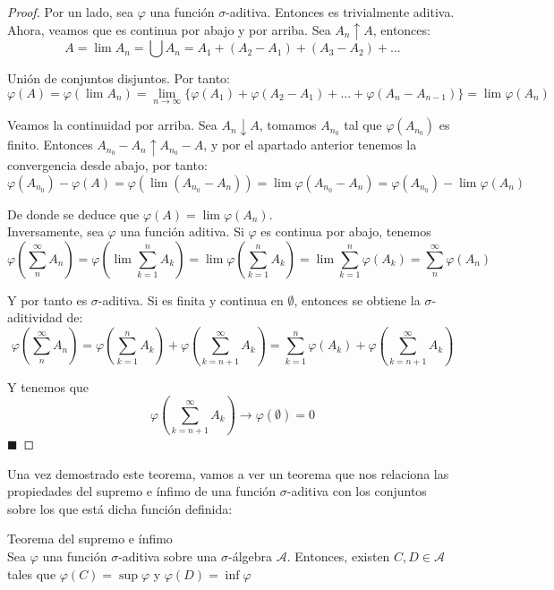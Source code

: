 \documentclass[12pt,a4paper]{book}
\newcommand*{\qed}{\hfill\ensuremath{\blacksquare}}
\begin{document}
\begin{proof}
Por un lado, sea $\varphi$ una función $\sigma$-aditiva. Entonces es trivialmente aditiva. Ahora, veamos que es continua por abajo y por arriba. Sea $A_n \uparrow A$, entonces:
$$ A = \lim A_n = \bigcup A_n = A_1 + (A_2 - A_1) + (A_3 - A_2) +... $$

Unión de conjuntos disjuntos. Por tanto:
$$ \varphi (A) = \varphi (\lim A_n) = \lim_{n \to \infty } \{ \varphi (A_1) + \varphi (A_2 - A_1) + ... + \varphi (A_n - A_{n-1}) \} = \lim \varphi (A_n) $$

Veamos la continuidad por arriba. Sea $A_n \downarrow A$, tomamos $A_{n_0}$ tal que $\varphi (A_{n_0})$ es finito. Entonces $A_{n_0} - A_n \uparrow A_{n_0} - A$, y por el apartado anterior tenemos la convergencia desde abajo, por tanto:
$$ \varphi (A_{n_0}) - \varphi (A) = \varphi (\lim (A_{n_0} - A_n)) = \lim \varphi (A_{n_0} - A_n) = \varphi (A_{n_0}) - \lim \varphi (A_n) $$

De donde se deduce que $ \varphi (A) = \lim \varphi (A_n) $.\\

Inversamente, sea $ \varphi$ una función aditiva. Si $\varphi$ es continua por abajo, tenemos
$$ \varphi \left( \sum_{n}^{\infty} A_n \right) = \varphi \left( \lim \sum_{k=1}^n A_k \right) = \lim \varphi \left( \sum_{k=1}^n A_k \right) = \lim \sum_{k=1}^n \varphi \left( A_k \right) = \sum_{n}^{\infty} \varphi (A_n) $$

Y por tanto es $\sigma$-aditiva. Si es finita y continua en $\emptyset$, entonces se obtiene la $\sigma$-aditividad de:
$$ \varphi \left( \sum_{n}^{\infty} A_n \right) = \varphi \left( \sum_{k=1}^{n} A_k \right) + \varphi \left( \sum_{k=n+1}^{\infty} A_k \right) = \sum_{k=1}^{n} \varphi (A_k) + \varphi \left( \sum_{k=n+1}^{\infty} A_k \right) $$

Y tenemos que 
$$ \varphi \left( \sum_{k=n+1}^{\infty} A_k \right) \to \varphi (\emptyset) = 0 $$
\qed 
\end{proof}

Una vez demostrado este teorema, vamos a ver un teorema que nos relaciona las propiedades del supremo e ínfimo de una función $\sigma$-aditiva con los conjuntos sobre los que está dicha función definida:

\begin{theorem}
Teorema del supremo e ínfimo\\

Sea $\varphi$ una función $\sigma$-aditiva sobre una $\sigma$-álgebra $\mathcal{A}$. Entonces, existen $C,D \in \mathcal{A}$ tales que $\varphi (C) = \sup \varphi$ y $\varphi (D) = \inf \varphi$
\end{theorem}
\end{document}
